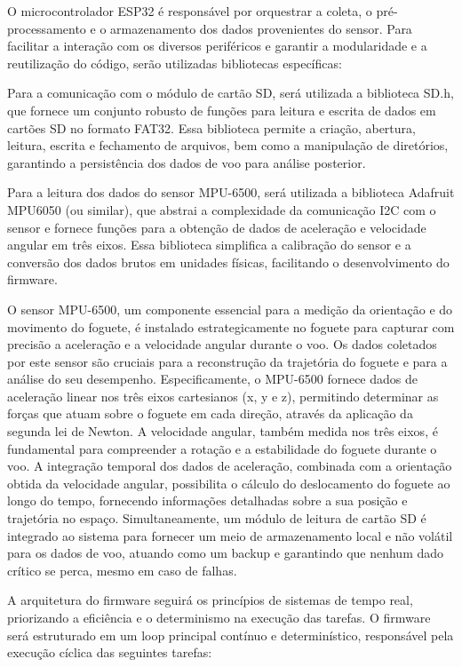 O microcontrolador ESP32 é responsável por orquestrar a coleta, o pré-processamento e o armazenamento dos dados provenientes do sensor. Para facilitar a interação com os diversos periféricos e garantir a modularidade e a reutilização do código, serão utilizadas bibliotecas específicas:

Para a comunicação com o módulo de cartão SD, será utilizada a biblioteca SD.h, que fornece um conjunto robusto de funções para leitura e escrita de dados em cartões SD no formato FAT32. Essa biblioteca permite a criação, abertura, leitura, escrita e fechamento de arquivos, bem como a manipulação de diretórios, garantindo a persistência dos dados de voo para análise posterior.

Para a leitura dos dados do sensor MPU-6500, será utilizada a biblioteca Adafruit MPU6050 (ou similar), que abstrai a complexidade da comunicação I2C com o sensor e fornece funções para a obtenção de dados de aceleração e velocidade angular em três eixos. Essa biblioteca simplifica a calibração do sensor e a conversão dos dados brutos em unidades físicas, facilitando o desenvolvimento do firmware.

O sensor MPU-6500, um componente essencial para a medição da orientação e do movimento do foguete, é instalado estrategicamente no foguete para capturar com precisão a aceleração e a velocidade angular durante o voo. Os dados coletados por este sensor são cruciais para a reconstrução da trajetória do foguete e para a análise do seu desempenho. Especificamente, o MPU-6500 fornece dados de aceleração linear nos três eixos cartesianos (x, y e z), permitindo determinar as forças que atuam sobre o foguete em cada direção, através da aplicação da segunda lei de Newton. A velocidade angular, também medida nos três eixos, é fundamental para compreender a rotação e a estabilidade do foguete durante o voo. A integração temporal dos dados de aceleração, combinada com a orientação obtida da velocidade angular, possibilita o cálculo do deslocamento do foguete ao longo do tempo, fornecendo informações detalhadas sobre a sua posição e trajetória no espaço. Simultaneamente, um módulo de leitura de cartão SD é integrado ao sistema para fornecer um meio de armazenamento local e não volátil para os dados de voo, atuando como um backup e garantindo que nenhum dado crítico se perca, mesmo em caso de falhas.

A arquitetura do firmware seguirá os princípios de sistemas de tempo real, priorizando a eficiência e o determinismo na execução das tarefas. O firmware será estruturado em um loop principal contínuo e determinístico, responsável pela execução cíclica das seguintes tarefas:

